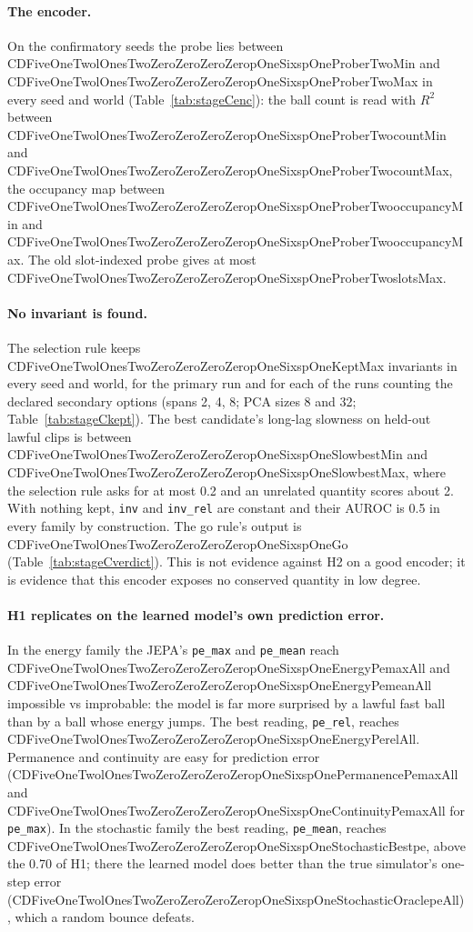 \documentclass[11pt]{article}
\newcommand{\Cp}[1]{\csname CDFiveOneTwolOnesTwoZeroZeroZeroZeropOneSixspOne#1\endcsname}
\begin{document}


\paragraph{The encoder.} On the confirmatory seeds the probe lies between \Cp{ProberTwoMin} and
\Cp{ProberTwoMax} in every seed and world (Table~\ref{tab:stageCenc}): the ball count is read with
$R^2$ between \Cp{ProberTwocountMin} and \Cp{ProberTwocountMax}, the occupancy map between
\Cp{ProberTwooccupancyMin} and \Cp{ProberTwooccupancyMax}. The old slot-indexed probe gives at most
\Cp{ProberTwoslotsMax}.

\paragraph{No invariant is found.} The selection rule keeps \Cp{KeptMax} invariants in every seed and
world, for the primary run and for each of the \CNOptions{} runs counting the declared secondary
options (spans 2, 4, 8; PCA sizes 8 and 32; Table~\ref{tab:stageCkept}). The best candidate's
long-lag slowness on held-out lawful clips is between \Cp{SlowbestMin} and \Cp{SlowbestMax}, where
the selection rule asks for at most 0.2 and an unrelated quantity scores about 2. With nothing kept,
\texttt{inv} and \texttt{inv\_rel} are constant and their AUROC is 0.5 in every family by
construction. The go rule's output is \Cp{Go} (Table~\ref{tab:stageCverdict}). This is not evidence
against H2 on a good encoder; it is evidence that this encoder exposes no conserved quantity in low
degree.

\paragraph{H1 replicates on the learned model's own prediction error.} In the energy family the
JEPA's \texttt{pe\_max} and \texttt{pe\_mean} reach \Cp{EnergyPemaxAll} and \Cp{EnergyPemeanAll}
impossible vs improbable: the model is far more surprised by a lawful fast ball than by a ball whose
energy jumps. The best reading, \texttt{pe\_rel}, reaches \Cp{EnergyPerelAll}. Permanence and
continuity are easy for prediction error (\Cp{PermanencePemaxAll} and \Cp{ContinuityPemaxAll} for
\texttt{pe\_max}). In the stochastic family the best reading, \texttt{pe\_mean}, reaches
\Cp{StochasticBestpe}, above the 0.70 of H1; there the learned model does better than the true
simulator's one-step error (\Cp{StochasticOraclepeAll}), which a random bounce defeats.
\end{document}
